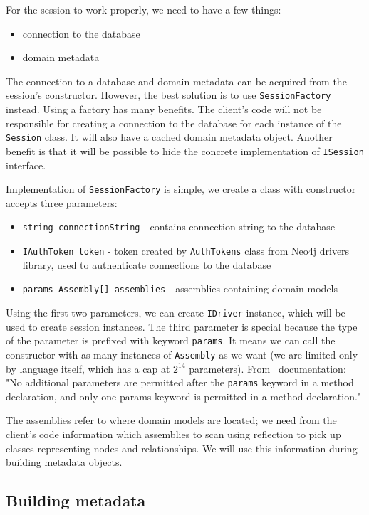 For the session to work properly, we need to have a few things:

\begin{itemize}
    \item connection to the database
    \item domain metadata
\end{itemize}

The connection to a database and domain metadata can be acquired from the session's constructor.
However, the best solution is to use \texttt{SessionFactory} instead.
Using a factory has many benefits.
The client's code will not be responsible for creating a connection to the database for each instance of the \texttt{Session} class.
It will also have a cached domain metadata object.
Another benefit is that it will be possible to hide the concrete implementation of \texttt{ISession} interface.

Implementation of \texttt{SessionFactory} is simple, we create a class with constructor accepts three parameters:
\begin{itemize}
    \item {\texttt{string connectionString} - contains connection string to the database}
    \item {\texttt{IAuthToken token} - token created by \texttt{AuthTokens} class from Neo4j drivers library, used to authenticate connections to the database}
    \item {\texttt{params Assembly[] assemblies} - assemblies containing domain models}
\end{itemize}
Using the first two parameters, we can create \texttt{IDriver} instance, which will be used to create session instances. The third parameter is special
because the type of the parameter is prefixed with keyword \texttt{params}. It means we can call the constructor with as many instances of \texttt{Assembly} as we want
(we are limited only by language itself, which has a cap at $2^{14}$ parameters). From \CS\ documentation:
"No additional parameters are permitted after the \texttt{params} keyword in a method declaration, and only one params keyword is permitted in a method declaration." \cite{billwagner_params_nodate}

The assemblies refer to where domain models are located;
we need from the client's code information which assemblies to scan using reflection to pick up classes representing nodes and relationships.
We will use this information during building metadata objects.

\subsection {Building metadata}

